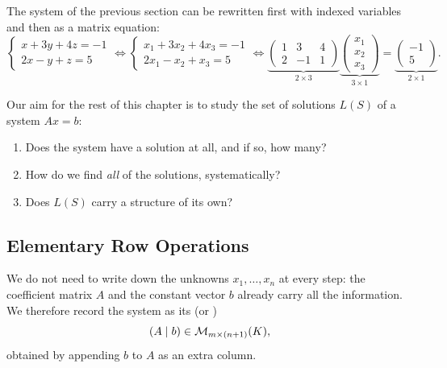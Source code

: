 \begin{example}
The system of the previous section can be rewritten first with indexed variables and then as a matrix equation:
\[
\begin{cases}
x + 3y + 4z = -1 \\
2x - y + z = 5
\end{cases}
\iff
\begin{cases}
x_1 + 3x_2 + 4x_3 = -1 \\
2x_1 - x_2 + x_3 = 5
\end{cases}
\iff
\underbrace{\begin{pmatrix} 1 & 3 & 4 \\ 2 & -1 & 1 \end{pmatrix}}_{2 \times 3}
\underbrace{\begin{pmatrix} x_1 \\ x_2 \\ x_3 \end{pmatrix}}_{3 \times 1}
=
\underbrace{\begin{pmatrix} -1 \\ 5 \end{pmatrix}}_{2 \times 1}.
\]
\end{example}

\begin{goals}
\label{goals:solution_set}
Our aim for the rest of this chapter is to study the set of solutions $L(S)$ of a system $A x = b$:
\begin{enumerate}[label=\textbf{(\alph*)}]
    \item Does the system have a solution at all, and if so, how many?
    \item How do we find \emph{all} of the solutions, systematically?
    \item Does $L(S)$ carry a structure of its own?
\end{enumerate}
\end{goals}

\subsection{Elementary Row Operations}

\begin{notation}
\label{not:augmented_matrix}
We do not need to write down the unknowns $x_1, \dots, x_n$ at every step: the coefficient matrix $A$ and the constant vector $b$ already carry all the information. We therefore record the system as its  (or )
\[
(A \mid b) \in \mathcal{M}_{m \times (n+1)}(K),
\]
obtained by appending $b$ to $A$ as an extra column.
\end{notation}

